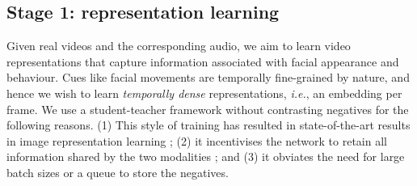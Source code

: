 \documentclass[10pt,twocolumn,letterpaper]{article}
\begin{document}
\subsection{Stage 1: representation learning}
Given real videos and the corresponding audio, we aim to learn video representations that capture information associated with facial appearance and behaviour. Cues like facial movements are temporally fine-grained by nature, and hence we wish to learn \textit{temporally dense} representations, \textit{i.e.}, an embedding per frame. We use a student-teacher framework without contrasting negatives for the following reasons. (1) This style of training has resulted in state-of-the-art results in image representation learning \cite{grill2020bootstrap}; (2) it incentivises the network to retain all information shared by the two modalities \cite{grill2020bootstrap}; and (3) it obviates the need for large batch sizes \cite{chen2020simple} or a queue \cite{he2020momentum} to store the negatives.
\end{document}

